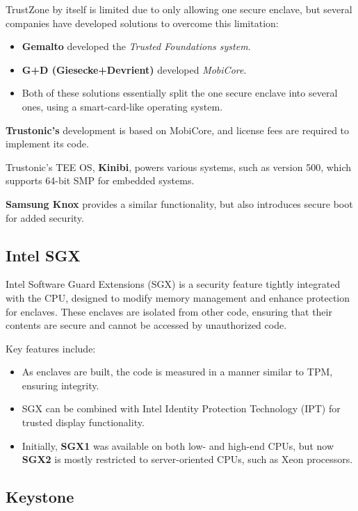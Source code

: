 TrustZone by itself is limited due to only allowing one secure enclave, but several companies have developed solutions to overcome this limitation:
\begin{itemize}
    \item \textbf{Gemalto} developed the \textit{Trusted Foundations system}.
    \item \textbf{G+D (Giesecke+Devrient)} developed \textit{MobiCore}.
    \item Both of these solutions essentially split the one secure enclave into several ones, using a smart-card-like operating system.
\end{itemize}

\textbf{Trustonic's} development is based on MobiCore, and license fees are required to implement its code. 

Trustonic’s TEE OS, \textbf{Kinibi}, powers various systems, such as version 500, which supports 64-bit SMP for embedded systems.

\textbf{Samsung Knox} provides a similar functionality, but also introduces secure boot for added security.


\subsection{Intel SGX}

Intel Software Guard Extensions (SGX) is a security feature tightly integrated with the CPU, designed to modify memory management and enhance protection for enclaves. These enclaves are isolated from other code, ensuring that their contents are secure and cannot be accessed by unauthorized code.

Key features include:
\begin{itemize}
    \item As enclaves are built, the code is measured in a manner similar to TPM, ensuring integrity.
    \item SGX can be combined with Intel Identity Protection Technology (IPT) for trusted display functionality.
    \item Initially, \textbf{SGX1} was available on both low- and high-end CPUs, but now \textbf{SGX2} is mostly restricted to server-oriented CPUs, such as Xeon processors.
\end{itemize}


\subsection{Keystone}

